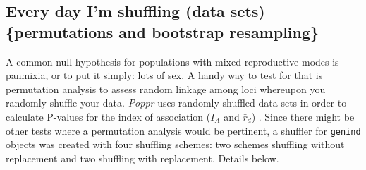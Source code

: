 \documentclass[letterpaper]{article}\usepackage[]{graphicx}\usepackage[]{color}
\newcommand{\tab}{\hspace*{1em}}
\begin{document}
\subsection{Every day I'm shuffling (data sets)  \{permutations and bootstrap resampling\}}\label{data.manip:shuffle}

\tab\tab A common null hypothesis for populations with mixed reproductive modes is panmixia, or to put it simply: lots of sex. A handy way to test for that is permutation analysis to assess random linkage among loci whereupon you randomly shuffle your data. \textit{Poppr} uses randomly shuffled data sets in order to calculate P-values for the index of association ($I_A$ and $\bar r_d$) \cite{Agapow:2001}. Since there might be other tests where a permutation analysis would be pertinent, a shuffler for \texttt{genind} objects was created with four shuffling schemes: two schemes shuffling without replacement and two shuffling with replacement. Details below.
\end{document}
